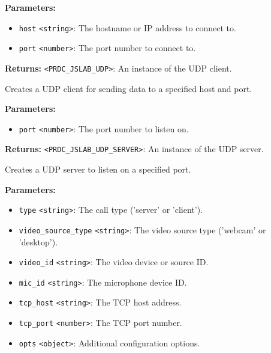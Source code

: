 \documentclass[12pt,a4paper]{article}
\begin{document}
\noindent \textbf{Parameters:}
\begin{itemize}
  \item \texttt{host} \texttt{<string>}: The hostname or IP address to connect to.
  \item \texttt{port} \texttt{<number>}: The port number to connect to.
\end{itemize}

\noindent \textbf{Returns:} \texttt{<PRDC\_JSLAB\_UDP>}: An instance of the UDP client.

\noindent Creates a UDP client for sending data to a specified host and port.

\vspace{5mm}
\noindent {}


\noindent \textbf{Parameters:}
\begin{itemize}
  \item \texttt{port} \texttt{<number>}: The port number to listen on.
\end{itemize}

\noindent \textbf{Returns:} \texttt{<PRDC\_JSLAB\_UDP\_SERVER>}: An instance of the UDP server.

\noindent Creates a UDP server to listen on a specified port.

\vspace{5mm}
\noindent {}


\noindent \textbf{Parameters:}
\begin{itemize}
  \item \texttt{type} \texttt{<string>}: The call type ('server' or 'client').
  \item \texttt{video\_source\_type} \texttt{<string>}: The video source type ('webcam' or 'desktop').
  \item \texttt{video\_id} \texttt{<string>}: The video device or source ID.
  \item \texttt{mic\_id} \texttt{<string>}: The microphone device ID.
  \item \texttt{tcp\_host} \texttt{<string>}: The TCP host address.
  \item \texttt{tcp\_port} \texttt{<number>}: The TCP port number.
  \item \texttt{opts} \texttt{<object>}: Additional configuration options.
\end{itemize}
\end{document}
